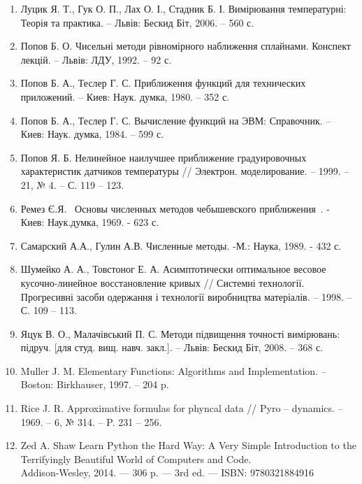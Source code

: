 \documentclass[ukrainian,14pt]{extarticle}
\begin{document}
\begin{enumerate}
\item Луцик Я. Т., Гук О. П., Лах О. І., Стадник Б. І. Вимірювання
температурні: Теорія та практика. – Львів: Бескид Біт, 2006. – 560 с.

\item Попов Б. О. Чисельні методи рівномірного наближення сплайнами.
Конспект лекцій. – Львів: ЛДУ, 1992. – 92 с.

\item Попов Б. А., Теслер Г. С. Приближения функций для технических
приложений. – Киев: Наук. думка, 1980. – 352 с.

\item Попов Б. А., Теслер Г. С. Вычисление функций на ЭВМ: Справочник. –
Киев: Наук. думка, 1984. – 599 с.

\item Попов Я. Б. Нелинейное наилучшее приближение градуировочных
характеристик датчиков температуры // Электрон. моделирование. –
1999. – 21, № 4. – С. 119 – 123.

\item Ремез Є.Я.  Основы численных методов чебышевского приближения . -
Киев: Наук.думка, 1969. - 623 с.

\item Самарский А.А., Гулин А.В. Численные методы. -М.: Наука, 1989. - 432 с.

\item Шумейко А. А., Товстоног Е. А. Асимптотически оптимальное весовое
кусочно-линейное восстановление кривых // Системні технології.
Прогресивні засоби одержання і технології виробництва матеріалів. –
1998. – С. 109 – 113.

\item Яцук В. О., Малачівський П. С. Методи підвищення точності
вимірювань: підруч. [для студ. вищ. навч. закл.]. – Львів: Бескид Біт, 2008. –
368 с.

\item Muller J. M. Elementary Functions: Algorithms and Implementation. –
Boston: Birkhauser, 1997. – 204 p.

\item Rice J. R. Approximative formulas for phyncal data // Pyro – dynamics. –
1969. – 6, № 314. – P. 231 – 256.

\item Zed A. Shaw Learn Python the Hard Way: A Very Simple Introduction to the Terrifyingly Beautiful World of Computers and Code. \\
Addison-Wesley, 2014. — 306 p. — 3rd ed. — ISBN: 9780321884916
\end{enumerate}
\end{document}
